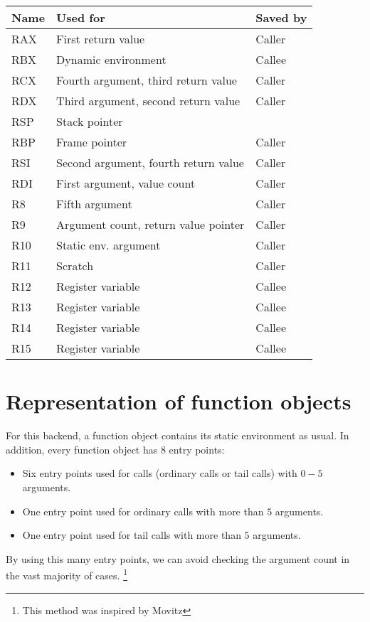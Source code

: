 \begin{tabular}{|l|l|l|}
\hline
Name & Used for & Saved by\\
\hline
\hline
RAX & First return value & Caller\\
RBX & Dynamic environment & Callee\\
RCX & Fourth argument, third return value & Caller \\
RDX & Third argument, second return value & Caller\\
RSP & Stack pointer &\\
RBP & Frame pointer & Caller\\
RSI & Second argument, fourth return value & Caller\\
RDI & First argument, value count & Caller\\
R8  & Fifth argument & Caller\\
R9  &  Argument count, return value pointer& Caller\\
R10 & Static env. argument & Caller\\
R11 & Scratch & Caller\\
R12 & Register variable & Callee\\
R13 & Register variable & Callee\\
R14 & Register variable & Callee\\
R15 & Register variable & Callee\\
\hline
\end{tabular}

\section{Representation of function objects}

For this backend, a function object contains its static environment as
usual.  In addition, every function object has $8$ entry points:

\begin{itemize}
\item Six entry points used for calls (ordinary calls or tail calls)
  with $0 - 5$ arguments.
\item One entry point used for ordinary calls with more than $5$
  arguments.
\item One entry point used for tail calls with more than $5$
  arguments.
\end{itemize}

By using this many entry points, we can avoid checking the argument
count in the vast majority of cases.%
\footnote{This method was inspired by Movitz}

